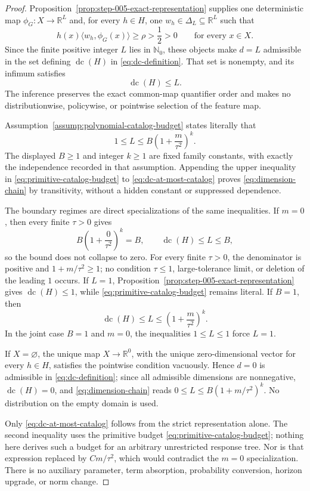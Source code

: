 \begin{proof}
Proposition~\ref{prop:step-005-exact-representation} supplies one
deterministic map $\phi_G:X\to\mathbb R^L$ and, for every $h\in H$, one
$w_h\in\Delta_L\subseteq\mathbb R^L$ such that
\[
h(x)\langle w_h,\phi_G(x)\rangle
\ge\rho>\frac12>0
\qquad\text{for every }x\in X.
\]
Since the finite positive integer $L$ lies in $\mathbb N_0$, these objects
make $d=L$ admissible in the set defining $\operatorname{dc}(H)$ in
\eqref{eq:dc-definition}.  That set is nonempty, and its infimum satisfies
\begin{equation}\label{eq:dc-at-most-catalog}
\operatorname{dc}(H)\le L.
\end{equation}
The inference preserves the exact common-map quantifier order and makes no
distributionwise, policywise, or pointwise selection of the feature map.

Assumption~\ref{assump:polynomial-catalog-budget} states literally that
\begin{equation}\label{eq:primitive-catalog-budget}
1\le L\le B\left(1+\frac{m}{\tau^2}\right)^k.
\end{equation}
The displayed $B\ge1$ and integer $k\ge1$ are fixed family constants, with
exactly the independence recorded in that assumption.  Appending the upper
inequality in \eqref{eq:primitive-catalog-budget} to
\eqref{eq:dc-at-most-catalog} proves \eqref{eq:dimension-chain} by
transitivity, without a hidden constant or suppressed dependence.

The boundary regimes are direct specializations of the same inequalities.
If $m=0$, then every finite $\tau>0$ gives
\[
B\left(1+\frac{0}{\tau^2}\right)^k=B,
\qquad
\operatorname{dc}(H)\le L\le B,
\]
so the bound does not collapse to zero.  For every finite $\tau>0$, the
denominator is positive and $1+m/\tau^2\ge1$; no condition $\tau\le1$,
large-tolerance limit, or deletion of the leading $1$ occurs.  If $L=1$,
Proposition~\ref{prop:step-005-exact-representation} gives
$\operatorname{dc}(H)\le1$, while
\eqref{eq:primitive-catalog-budget} remains literal.  If $B=1$, then
\[
\operatorname{dc}(H)\le L
\le\left(1+\frac{m}{\tau^2}\right)^k.
\]
In the joint case $B=1$ and $m=0$, the inequalities
$1\le L\le1$ force $L=1$.

If $X=\varnothing$, the unique map $X\to\mathbb R^0$, with the unique
zero-dimensional vector for every $h\in H$, satisfies the pointwise condition
vacuously.  Hence $d=0$ is admissible in
\eqref{eq:dc-definition}; since all admissible dimensions are nonnegative,
$\operatorname{dc}(H)=0$, and \eqref{eq:dimension-chain} reads
$0\le L\le B(1+m/\tau^2)^k$.  No distribution on the empty domain is used.

Only \eqref{eq:dc-at-most-catalog} follows from the strict representation
alone.  The second inequality uses the primitive budget
\eqref{eq:primitive-catalog-budget}; nothing here derives such a budget for an
arbitrary unrestricted response tree.  Nor is that expression replaced by
$Cm/\tau^2$, which would contradict the $m=0$ specialization.  There is no
auxiliary parameter, term absorption, probability conversion, horizon
upgrade, or norm change.
\end{proof}

